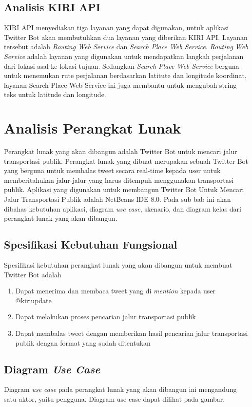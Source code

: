 \subsection{Analisis KIRI API}
KIRI API menyediakan tiga layanan yang dapat digunakan, untuk aplikasi Twitter Bot akan membutuhkan dua layanan yang diberikan KIRI API. Layanan tersebut adalah \textit{Routing Web Service} dan \textit{Search Place Web Service}. \textit{Routing Web Service} adalah layanan yang digunakan untuk mendapatkan langkah perjalanan dari lokasi asal ke lokasi tujuan. Sedangkan \textit{Search Place Web Service} berguna untuk menemukan rute perjalanan berdasarkan latitute dan longitude koordinat,  layanan Search Place Web Service ini juga membantu untuk mengubah string teks untuk latitude dan longitude.

\section{Analisis Perangkat Lunak}

Perangkat lunak yang akan dibangun adalah Twitter Bot untuk mencari jalur transportasi publik. Perangkat lunak yang dibuat merupakan sebuah Twitter Bot yang berguna untuk membalas tweet secara real-time kepada user untuk memberitahukan jalur-jalur yang harus ditempuh menggunakan transportasi publik. Aplikasi yang digunakan untuk membangun Twitter Bot Untuk Mencari Jalur Transportasi Publik adalah NetBeans IDE 8.0. Pada sub bab ini akan dibahas kebutuhan aplikasi, diagram \textit{use case}, skenario, dan diagram kelas dari perangkat lunak yang akan dibangun.

\subsection{Spesifikasi Kebutuhan Fungsional}
Spesifikasi kebutuhan perangkat lunak yang akan dibangun untuk membuat Twitter Bot adalah
\begin{enumerate}
	\item Dapat menerima dan membaca tweet yang di \textit{mention} kepada user @kiriupdate
	\item Dapat melakukan proses pencarian jalur transportasi publik
	\item Dapat membalas tweet dengan memberikan hasil pencarian jalur transportasi publik dengan format yang sudah ditentukan
\end{enumerate}

\subsection{Diagram \textit{Use Case}}
Diagram \textit{use case} pada perangkat lunak yang akan dibangun ini mengandung satu aktor, yaitu pengguna. Diagram use case dapat dilihat pada gambar.

